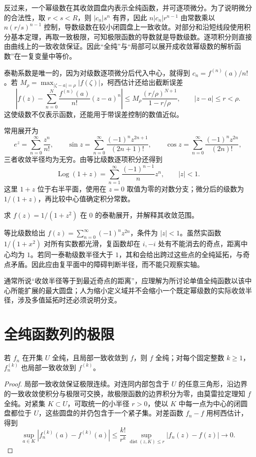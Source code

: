 \documentclass[UTF8,12pt,a4paper,fontset=fandol]{ctexbook}
\begin{document}
反过来，一个幂级数在其收敛圆盘内表示全纯函数，并可逐项微分。为了说明微分的合法性，取 $r<s<R$，则 $|c_n|s^n$ 有界，因此 $n|c_n|r^{n-1}$ 由常数乘以 $n(r/s)^{n-1}$ 控制，导数级数在较小闭圆盘上一致收敛。对部分和沿短线段使用积分基本定理，再取一致极限，可知极限函数的导数就是导数级数。逐项积分则直接由曲线上的一致收敛保证。因此“全纯”与“局部可以展开成收敛幂级数的解析函数”在一复变量中等价。

泰勒系数是唯一的，因为对级数逐项微分后代入中心，就得到 $c_n=f^{(n)}(a)/n!$。若 $M_\rho=\max_{|\zeta-a|=\rho}|f(\zeta)|$，柯西估计还给出截断误差
\begin{equation}
 \left|f(z)-\sum_{n=0}^{N}\frac{f^{(n)}(a)}{n!}(z-a)^n\right|
 \le M_\rho\frac{(r/\rho)^{N+1}}{1-r/\rho},\qquad |z-a|\le r<\rho.
 \label{eq:cv-taylor-error}
\end{equation}
这使级数不仅表示函数，还能用于带误差控制的数值近似。

常用展开为
\[
 e^z=\sum_{n=0}^\infty\frac{z^n}{n!},\qquad
 \sin z=\sum_{n=0}^\infty\frac{(-1)^nz^{2n+1}}{(2n+1)!},\qquad
 \cos z=\sum_{n=0}^\infty\frac{(-1)^nz^{2n}}{(2n)!},
\]
三者收敛半径均为无穷。由等比级数逐项积分还得到
\[
 \operatorname{Log}(1+z)=\sum_{n=1}^\infty\frac{(-1)^{n-1}}n z^n,
 \qquad |z|<1.
\]
这里 $1+z$ 位于右半平面，使用在 $z=0$ 取值为零的对数分支；微分后的级数为 $1/(1+z)$，再比较中心值确定积分常数。

\begin{example}[实轴上的光滑不能决定泰勒半径]
求 $f(z)=1/(1+z^2)$ 在 $0$ 的泰勒展开，并解释其收敛范围。
\end{example}
\begin{solve}
等比级数给出 $f(z)=\sum_{n=0}^\infty(-1)^nz^{2n}$，条件为 $|z|<1$。虽然实函数 $1/(1+x^2)$ 对所有实数都光滑，复函数却在 $i,-i$ 处有不能消去的奇点，距离中心均为 $1$。若同一泰勒级数半径大于 $1$，其和会给出跨过这些点的全纯延拓，与奇点矛盾。因此应由复平面中的障碍判断半径，而不能只观察实轴。
\end{solve}

通常所说“收敛半径等于到最近奇点的距离”，应理解为所讨论单值全纯函数以该中心所能扩展的最大圆盘；人为缩小定义域并不会缩小一个既定幂级数的实际收敛半径，涉及多值延拓时还必须说明分支。

\section{全纯函数列的极限}

\begin{theorem}[局部一致极限定理]
\label{thm:cv-uniform-limit}
若 $f_n$ 在开集 $U$ 全纯，且局部一致收敛到 $f$，则 $f$ 全纯；对每个固定整数 $k\ge1$，$f_n^{(k)}$ 也局部一致收敛到 $f^{(k)}$。
\end{theorem}
\begin{proof}
局部一致收敛保证极限连续。对连同内部包含于 $U$ 的任意三角形，沿边界的一致收敛使积分与极限可交换，故极限函数的边界积分为零，由莫雷拉定理知 $f$ 全纯。对紧集 $K\subset U$，可取统一的小半径 $r>0$，使以 $K$ 中每一点为中心的闭圆盘都位于 $U$，这些圆盘的并仍包含于一个紧子集。对差函数 $f_n-f$ 用柯西估计，得到
\[
 \sup_{a\in K}|f_n^{(k)}(a)-f^{(k)}(a)|
 \le\frac{k!}{r^k}\sup_{\operatorname{dist}(z,K)\le r}|f_n(z)-f(z)|\longrightarrow0.
\]
\end{proof}
\end{document}

